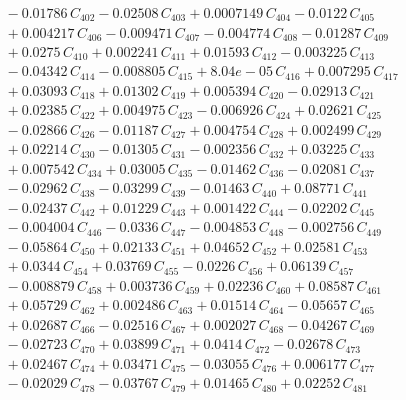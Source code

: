 \documentclass[a4paper,11pt]{article}
\begin{document}
\begin{align}
&\quad - 0.01786\,C_{402} - 0.02508\,C_{403} + 0.0007149\,C_{404} - 0.0122\,C_{405} \nonumber\\
&\quad + 0.004217\,C_{406} - 0.009471\,C_{407} - 0.004774\,C_{408} - 0.01287\,C_{409} \nonumber\\
&\quad + 0.0275\,C_{410} + 0.002241\,C_{411} + 0.01593\,C_{412} - 0.003225\,C_{413} \nonumber\\
&\quad - 0.04342\,C_{414} - 0.008805\,C_{415} + 8.04e-05\,C_{416} + 0.007295\,C_{417} \nonumber\\
&\quad + 0.03093\,C_{418} + 0.01302\,C_{419} + 0.005394\,C_{420} - 0.02913\,C_{421} \nonumber\\
&\quad + 0.02385\,C_{422} + 0.004975\,C_{423} - 0.006926\,C_{424} + 0.02621\,C_{425} \nonumber\\
&\quad - 0.02866\,C_{426} - 0.01187\,C_{427} + 0.004754\,C_{428} + 0.002499\,C_{429} \nonumber\\
&\quad + 0.02214\,C_{430} - 0.01305\,C_{431} - 0.002356\,C_{432} + 0.03225\,C_{433} \nonumber\\
&\quad + 0.007542\,C_{434} + 0.03005\,C_{435} - 0.01462\,C_{436} - 0.02081\,C_{437} \nonumber\\
&\quad - 0.02962\,C_{438} - 0.03299\,C_{439} - 0.01463\,C_{440} + 0.08771\,C_{441} \nonumber\\
&\quad - 0.02437\,C_{442} + 0.01229\,C_{443} + 0.001422\,C_{444} - 0.02202\,C_{445} \nonumber\\
&\quad - 0.004004\,C_{446} - 0.0336\,C_{447} - 0.004853\,C_{448} - 0.002756\,C_{449} \nonumber\\
&\quad - 0.05864\,C_{450} + 0.02133\,C_{451} + 0.04652\,C_{452} + 0.02581\,C_{453} \nonumber\\
&\quad + 0.0344\,C_{454} + 0.03769\,C_{455} - 0.0226\,C_{456} + 0.06139\,C_{457} \nonumber\\
&\quad - 0.008879\,C_{458} + 0.003736\,C_{459} + 0.02236\,C_{460} + 0.08587\,C_{461} \nonumber\\
&\quad + 0.05729\,C_{462} + 0.002486\,C_{463} + 0.01514\,C_{464} - 0.05657\,C_{465} \nonumber\\
&\quad + 0.02687\,C_{466} - 0.02516\,C_{467} + 0.002027\,C_{468} - 0.04267\,C_{469} \nonumber\\
&\quad - 0.02723\,C_{470} + 0.03899\,C_{471} + 0.0414\,C_{472} - 0.02678\,C_{473} \nonumber\\
&\quad + 0.02467\,C_{474} + 0.03471\,C_{475} - 0.03055\,C_{476} + 0.006177\,C_{477} \nonumber\\
&\quad - 0.02029\,C_{478} - 0.03767\,C_{479} + 0.01465\,C_{480} + 0.02252\,C_{481} \nonumber\\

\end{align}
\end{document}
